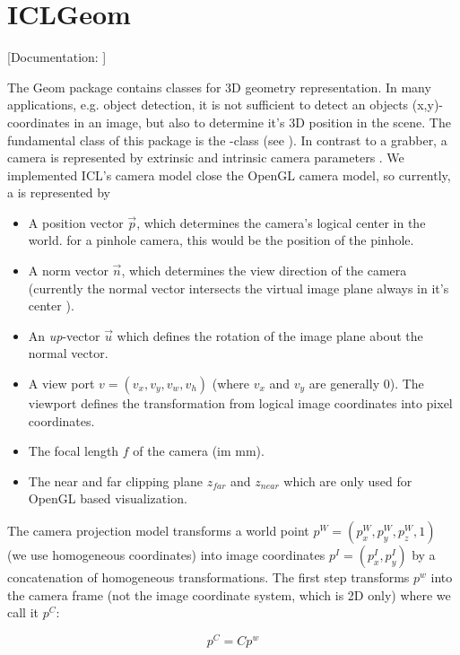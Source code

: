\section{ICLGeom\label{sec:geom}}
[Documentation: ]


The Geom package contains classes for 3D geometry representation. In many applications, e.g. object detection, it is not sufficient to detect an objects (x,y)-coordinates in an image, but also to determine it's 3D position in the scene. The fundamental class of this package is the -class (see ). In contrast to a grabber, a camera is represented by extrinsic and intrinsic camera parameters . We implemented ICL's camera model close the OpenGL camera model, so currently, a  is represented by
\begin{itemize}
\item A position vector $\vec{p}$, which determines the camera's logical center in the world. for a pinhole camera, this would be the position of the pinhole.
\item A norm vector $\vec{n}$, which determines the view direction of the camera (currently the normal vector intersects the virtual image plane always in it's center ).
\item An \emph{up}-vector $\vec{u}$ which defines the rotation of the image plane about the normal vector.
\item A view port $v=(v_x,v_y,v_w,v_h)$ (where $v_x$ and $v_y$ are generally $0$). The viewport defines the transformation from logical image coordinates into pixel coordinates.
\item The focal length $f$ of the camera (im mm).
\item The near and far clipping plane $z_{far}$ and $z_{near}$ which are only used for OpenGL based visualization. 
\end{itemize}

The camera projection model transforms a world point $p^W=(p^W_x,p^W_y,p^W_z,1)$ (we use homogeneous coordinates) into image coordinates $p^I=(p^I_x,p^I_y)$ by a concatenation of homogeneous transformations. The first step transforms $p^w$ into the camera frame (not the image coordinate system, which is 2D only) where we call it $p^C$:

\begin{equation}
p^C = C p^w
\end{equation}


